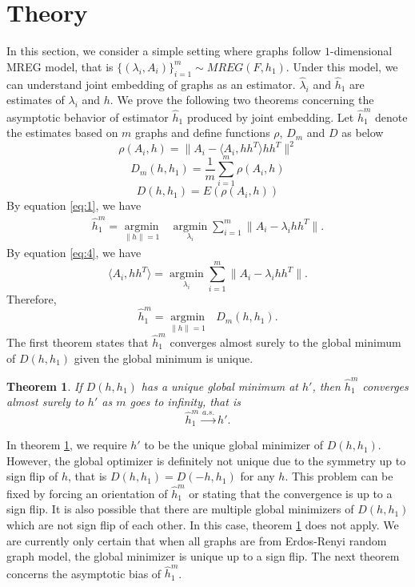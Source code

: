 \documentclass[10pt,journal,compsoc]{IEEEtran}
\newtheorem{theorem}{Theorem}[section]
\begin{document}
\section{Theory}
In this section, we consider a simple setting where graphs follow $1$-dimensional MREG model, that is $\{(\lambda_i,A_i)\} _{i=1}^m \sim MREG(F,h_1)$. Under this model, we can understand joint embedding of graphs as an estimator. $\hat{\lambda}_i$ and $\hat{h}_1$ are estimates of $\lambda_i$ and $h$. We prove the following two theorems concerning the asymptotic behavior of estimator $\hat{h}_1$ produced by joint embedding. Let $\hat{h}_1^m$ denote the estimates based on $m$ graphs and define functions $\rho$, $D_m$ and $D$ as below
\[ \rho(A_i,h)= \|A_i- \langle A_i,h h^T \rangle h h^T\|^2 \]
\[ D_m(h,h_1) =\frac{1}{m}\sum_{i=1}^{m} \rho(A_i,h) \]
\[ D(h,h_1) = E(\rho(A_i,h)) \]
By equation \eqref{eq:1}, we have
\begin{align*} 
\hat{h}_1^m = \underset{\|h\| =1}{\operatorname{argmin}} \text{ }   \underset{\lambda_i}{\operatorname{argmin}} \sum_{i=1}^{m} \|A_i - \lambda_i h h^T\| .
\end{align*}
By equation \eqref{eq:4}, we have 
\[\langle A_i,hh^T \rangle=\underset{\lambda_i}{\operatorname{argmin}} \sum_{i=1}^{m} \|A_i - \lambda_i h h^T\|.\]
Therefore,
\[\hat{h}_1^m = \underset{\|h\| =1}{\operatorname{argmin}} \text{ } D_m(h,h_1). \]
The first theorem states that $\hat{h}_1^m$  converges almost surely to the global minimum of $D(h,h_1)$ given the global minimum is unique.
\begin{theorem}
	\label{thm:1}
	If $D(h,h_1)$ has a unique global minimum at $h'$, then $\hat{h}_1^m$ converges almost surely to $h'$ as $m$ goes to infinity, that is 
	\[ \hat{h}_1^m \overset{a.s.}{\rightarrow} h'. \]
\end{theorem}

\noindent In theorem \ref{thm:1}, we require $h'$ to be the unique global minimizer of $D(h,h_1)$. However, the global optimizer is definitely not unique due to the symmetry up to sign flip of $h$, that is $D(h,h_1)=D(-h,h_1)$ for any $h$. This problem can be fixed by forcing an orientation of $\hat{h}_1^m$ or stating that the convergence is up to a sign flip. It is also possible that there are multiple global minimizers of $D(h,h_1)$ which are not sign flip of each other. In this case, theorem \ref{thm:1} does not apply. We are currently only certain that when all graphs are from Erdos-Renyi random graph model, the global minimizer is unique up to a sign flip. The next theorem concerns the asymptotic bias of $\hat{h}_1^m$. 
\end{document}
